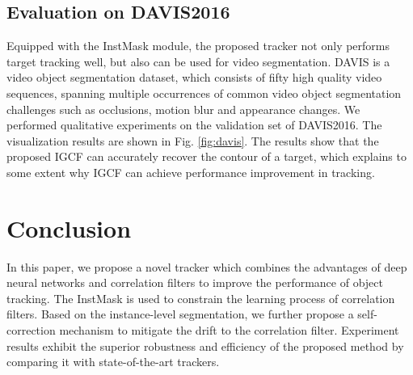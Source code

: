 \subsection{Evaluation on DAVIS2016}
Equipped with the InstMask module, the proposed tracker not only performs target tracking well, but also can be used for video segmentation. DAVIS \cite{Perazzi2016} is a video object segmentation dataset, which consists of fifty high quality video sequences, spanning multiple occurrences of common video object segmentation challenges such as occlusions, motion blur and appearance changes. We performed qualitative experiments on the validation set of DAVIS2016. The visualization results are shown in Fig. \ref{fig:davis}. The results show that the proposed IGCF can accurately recover the contour of a target, which explains to some extent why IGCF can achieve performance improvement in tracking.

\section{Conclusion}
In this paper, we propose a novel tracker which combines the advantages of deep neural networks and correlation filters to improve the performance of object tracking.
The InstMask is used to constrain the learning process of correlation filters. Based on the instance-level segmentation, we further propose a self-correction mechanism to mitigate the drift to the correlation filter.
Experiment results exhibit the superior robustness and efficiency of the proposed method by comparing it with state-of-the-art trackers.
